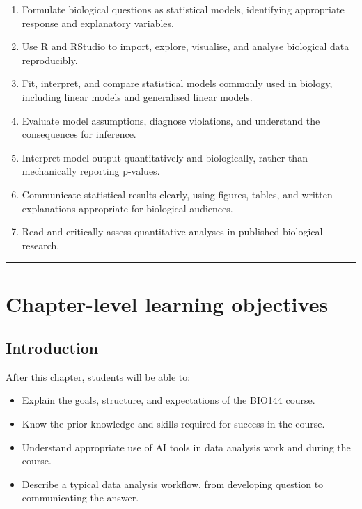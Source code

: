 \documentclass[
  letterpaper,
  8pt,
  a4paper]{book}
\providecommand{\tightlist}{%
  \setlength{\itemsep}{0pt}\setlength{\parskip}{0pt}}
\begin{document}
\begin{enumerate}
\def\labelenumi{\arabic{enumi}.}
\tightlist
\item
  Formulate biological questions as statistical models, identifying
  appropriate response and explanatory variables.
\item
  Use R and RStudio to import, explore, visualise, and analyse
  biological data reproducibly.
\item
  Fit, interpret, and compare statistical models commonly used in
  biology, including linear models and generalised linear models.
\item
  Evaluate model assumptions, diagnose violations, and understand the
  consequences for inference.
\item
  Interpret model output quantitatively and biologically, rather than
  mechanically reporting p-values.
\item
  Communicate statistical results clearly, using figures, tables, and
  written explanations appropriate for biological audiences.
\item
  Read and critically assess quantitative analyses in published
  biological research.
\end{enumerate}

\begin{center}\rule{0.5\linewidth}{0.5pt}\end{center}

\section*{Chapter-level learning
objectives}\label{chapter-level-learning-objectives}


\subsection*{Introduction}\label{introduction}

After this chapter, students will be able to:

\begin{itemize}
\tightlist
\item
  Explain the goals, structure, and expectations of the BIO144 course.
\item
  Know the prior knowledge and skills required for success in the
  course.
\item
  Understand appropriate use of AI tools in data analysis work and
  during the course.
\item
  Describe a typical data analysis workflow, from developing question to
  communicating the answer.
\end{itemize}
\end{document}
